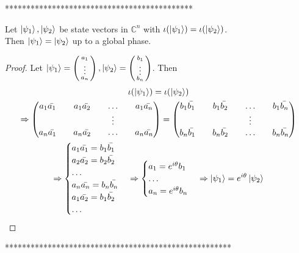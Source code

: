 ********************************************

\begin{lemma}
\label{lemma state into density}
Let $\ket{\psi_1}, \ket{\psi_2}$ be state vectors in ${\mathbb{C}}^n$ with $\iota({\ket{\psi_1}})=\iota(\ket{\psi_2})$.\\
Then $\ket{\psi_1}=\ket{\psi_2}$ up to a global phase.
\end{lemma}
\begin{proof}
Let $\ket{\psi_1}=\left(\begin{smallmatrix}a_1\\ \vdots \\ a_n\end{smallmatrix}\right), \ket{\psi_2}=\left(\begin{smallmatrix}b_1\\ \vdots \\ b_n\end{smallmatrix}\right)$. Then
\begin{gather}
\iota({\ket{\psi_1}})=\iota(\ket{\psi_2})\\
\Rightarrow \begin{pmatrix}
a_1 \Bar{a_1} && a_1 \Bar{a_2} && \hdots && a_1 \Bar{a_n}\\
&& && \vdots && \\
a_n \Bar{a_1} && a_n \Bar{a_2} && \hdots && a_n \Bar{a_n}\\              
\end{pmatrix}=\begin{pmatrix}
b_1 \Bar{b_1} && b_1 \Bar{b_2} && \hdots && b_1 \Bar{b_n}\\
&& && \vdots && \\
b_n \Bar{b_1} && b_n \Bar{b_2} && \hdots && b_n \Bar{b_n}\\ 
\end{pmatrix}\\
\Rightarrow 
\begin{cases}
a_1 \Bar{a_1}=b_1 \Bar{b_1}\\
a_2 \Bar{a_2}=b_2 \Bar{b_2}\\
\hdots\\
a_n \Bar{a_n}=b_n \Bar{b_n}\\
a_1 \Bar{a_2}=b_1 \Bar{b_2}\\
\hdots
\end{cases}
\Rightarrow \begin{cases}
a_1 = e^{i\theta}b_1\\
\hdots\\
a_n = e^{i\theta}b_n
\end{cases}
\Rightarrow\ket{\psi_1}=e^{i\theta}\ket{\psi_2}
\end{gather}
\end{proof}

*****************************************************

